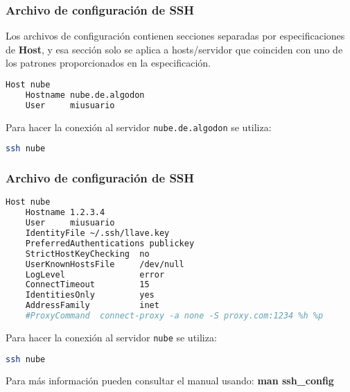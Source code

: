 \begin{frame}[fragile]
  \frametitle{Archivo de configuración de SSH}

  Los archivos de configuración contienen secciones separadas por
  especificaciones de \textbf{Host}, y esa sección solo se aplica
  a hosts/servidor que coinciden con uno de los patrones
  proporcionados en la especificación.

  \vspace{\baselineskip}
  \begin{lstlisting}[language=Bash,basicstyle={\footnotesize\ttfamily}]
Host nube
    Hostname nube.de.algodon
    User     miusuario
  \end{lstlisting}

  \pausa
  \vspace{\baselineskip}
  Para hacer la conexión al servidor \texttt{nube.de.algodon} se utiliza:
  \begin{lstlisting}[language=Bash]
ssh nube
  \end{lstlisting}
\end{frame}

\begin{frame}[fragile]
  \frametitle{Archivo de configuración de SSH}

  \begin{lstlisting}[language=Bash,basicstyle={\footnotesize\ttfamily}]
Host nube
    Hostname 1.2.3.4
    User     miusuario
    IdentityFile ~/.ssh/llave.key
    PreferredAuthentications publickey
    StrictHostKeyChecking  no
    UserKnownHostsFile     /dev/null
    LogLevel               error
    ConnectTimeout         15
    IdentitiesOnly         yes
    AddressFamily          inet
    #ProxyCommand  connect-proxy -a none -S proxy.com:1234 %h %p
  \end{lstlisting}

  Para hacer la conexión al servidor \texttt{nube} se utiliza:
  \begin{lstlisting}[language=Bash]
ssh nube
  \end{lstlisting}

  Para más información pueden consultar el manual usando:
  \textbf{man ssh\_config}
\end{frame}

